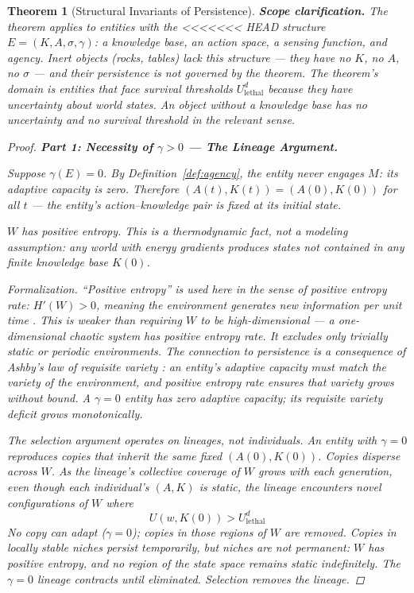 \documentclass[11pt]{article}
\newtheorem{theorem}{Theorem}
\theoremstyle{definition}
\theoremstyle{remark}
\begin{document}
\begin{theorem}[Structural Invariants of Persistence]
\textbf{Scope clarification.} The theorem applies to entities with the
<<<<<<< HEAD
structure $E = (K, A, \sigma, \gamma)$: a knowledge base, an action
space, a sensing function, and agency. Inert objects (rocks, tables)
lack this structure --- they have no $K$, no $A$, no $\sigma$ --- and
their persistence is not governed by the theorem. The theorem's domain
is entities that \emph{face} survival thresholds $U_{\mathrm{lethal}}^d$
because they \emph{have} uncertainty about world states. An object
without a knowledge base has no uncertainty and no survival threshold
in the relevant sense.

\begin{proof}

\textbf{Part 1: Necessity of $\gamma > 0$ --- The Lineage Argument.}

Suppose $\gamma(E) = 0$. By Definition~\ref{def:agency}, the entity never
engages $M$: its adaptive capacity is zero. Therefore $(A(t), K(t)) =
(A(0), K(0))$ for all $t$ --- the entity's action--knowledge pair is
fixed at its initial state.

$W$ has positive entropy. This is a thermodynamic fact, not a modeling
assumption: any world with energy gradients produces states not
contained in any finite knowledge base $K(0)$.

\emph{Formalization.} ``Positive entropy'' is used here in the sense of
positive entropy rate: $H'(W) > 0$, meaning the environment generates
new information per unit time \cite{Cover2006}. This is weaker than
requiring $W$ to be high-dimensional --- a one-dimensional chaotic
system has positive entropy rate. It excludes only trivially static or
periodic environments. The connection to persistence is a consequence
of Ashby's law of requisite variety \cite{Ashby1956}: an entity's
adaptive capacity must match the variety of the environment, and
positive entropy rate ensures that variety grows without bound. A
$\gamma = 0$ entity has zero adaptive capacity; its requisite variety
deficit grows monotonically.

The selection argument operates on \emph{lineages}, not individuals.
An entity with $\gamma = 0$ reproduces copies that inherit the same fixed
$(A(0), K(0))$. Copies disperse across $W$. As the lineage's collective
coverage of $W$ grows with each generation, even though each
individual's $(A, K)$ is static, the lineage encounters novel
configurations of $W$ where
\[
U(w, K(0)) > U_{\mathrm{lethal}}^d
\]
No copy can adapt ($\gamma = 0$); copies in those regions of $W$ are
removed. Copies in locally stable niches persist temporarily, but
niches are not permanent: $W$ has positive entropy, and no region of
the state space remains static indefinitely. The $\gamma = 0$ lineage
contracts until eliminated. Selection removes the lineage.


\end{proof}
\end{theorem}
\end{document}
